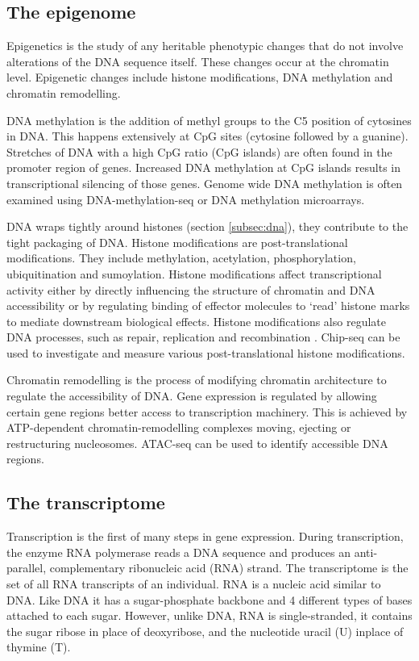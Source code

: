 
\subsection{The epigenome}
Epigenetics is the study of any heritable phenotypic changes that do not involve alterations of the DNA sequence itself.
These changes occur at the chromatin level.
Epigenetic changes include histone modifications, DNA methylation and chromatin remodelling.

DNA methylation is the addition of methyl groups to the C5 position of cytosines in DNA.
This happens extensively at CpG sites (cytosine followed by a guanine).
Stretches of DNA with a high CpG ratio (CpG islands) are often found in the promoter region of genes.
Increased DNA methylation at CpG islands results in transcriptional silencing of those genes.
Genome wide DNA methylation is often examined using DNA-methylation-seq or DNA methylation microarrays.

DNA wraps tightly around histones (section \ref{subsec:dna}), they contribute to the tight packaging of DNA.
Histone modifications are post-translational modifications.
They include methylation, acetylation, phosphorylation, ubiquitination and sumoylation.
Histone modifications affect transcriptional activity either by directly influencing the structure of chromatin and DNA accessibility or by regulating binding of effector molecules to `read' histone marks to mediate downstream biological effects.
Histone modifications also regulate DNA processes, such as repair, replication and recombination \cite{ bannister2011regulation}.
Chip-seq can be used to investigate and measure various post-translational histone modifications.

Chromatin remodelling is the process of modifying chromatin architecture to regulate the accessibility of DNA.
Gene expression is regulated by allowing certain gene regions better access to transcription machinery.
This is achieved by ATP-dependent chromatin-remodelling complexes moving, ejecting or restructuring nucleosomes.
ATAC-seq can be used to identify accessible DNA regions.


\subsection{The transcriptome}
Transcription is the first of many steps in gene expression.
During transcription, the enzyme RNA polymerase reads a DNA sequence and produces an anti-parallel, complementary ribonucleic acid (RNA) strand.
The transcriptome is the set of all RNA transcripts of an individual.
RNA is a nucleic acid similar to DNA. Like DNA it has a sugar-phosphate backbone and 4 different types of bases attached to each sugar.
However, unlike DNA, RNA is single-stranded, it contains the sugar ribose in place of deoxyribose, and the nucleotide uracil (U) inplace of thymine (T).


